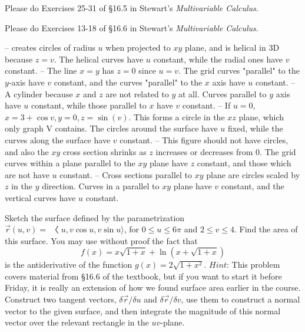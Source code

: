 \documentclass[12pt]{exam}
\begin{document}
\begin{questions}
\question Please do Exercises 25-31 of §16.5 in Stewart's \textit{Multivariable Calculus}.

\question Please do Exercises 13-18 of §16.6 in Stewart’s \textit{Multivariable Calculus}.
    \begin{solution}
        \begin{questions}
            \setcounter{question}{12}
            \question {} -- creates circles of radius $u$ when projected to $xy$ plane, and is helical in 3D because $z = v$. The helical curves have $u$ constant, while the radial ones have $v$ constant.
            \question {} -- The line $x=y$ has $z=0$ since $u=v$. The grid curves "parallel" to the $y$-axis have $v$ constant, and the curves "parallel" to the $x$ axis have $u$ constant.
            \question {} -- A cylinder because $x$ and $z$ are not related to $y$ at all. Curves parallel to $y$ axis have $u$ constant, while those parallel to $x$ have $v$ constant.
            \question {} -- If $u=0$, $x = 3 + \cos v, y = 0, z = \sin(v)$. This forms a circle in the $xz$ plane, which only graph V contains. The circles around the surface have $u$ fixed, while the curves along the surface have $v$ constant.
            \question {} -- This figure should not have circles, and also the $xy$ cross section shrinks as $z$ increases or decreases from 0. The grid curves within a plane parallel to the $xy$ plane have $z$ constant, and those which are not have $u$ constant.
            \question  {} -- Cross sections parallel to $xy$ plane are circles scaled by $z$ in the $y$ direction. Curves in a parallel to $xy$ plane have $v$ constant, and the vertical curves have $u$ constant.
        \end{questions}
    \end{solution}

\question Sketch the surface defined by the parametrization $\overrightarrow{r} (u, v) = 〈u, v \cos u, v \sin u \rangle$, for $0 \leq u \leq 6\pi$ and $2 \leq v \leq 4$. Find the area of this surface. You may use without proof the fact that
\[f (x) = x\sqrt{1 + x} + \ln(x + \sqrt{1 + x})\]
is the antiderivative of the function $g(x) = 2\sqrt{1 + x^2}$. $Hint$: This problem covers material from §16.6 of the textbook, but if you want to start it before Friday, it is really an extension of how we found surface area earlier in the course. Construct two tangent vectors, $\delta \overrightarrow{r} / \delta u$ and $\delta \overrightarrow{r} / \delta v$, use them to construct a normal vector to the given surface, and then integrate the magnitude of this normal vector over the relevant rectangle in the $uv$-plane.

\end{questions}
\end{document}
